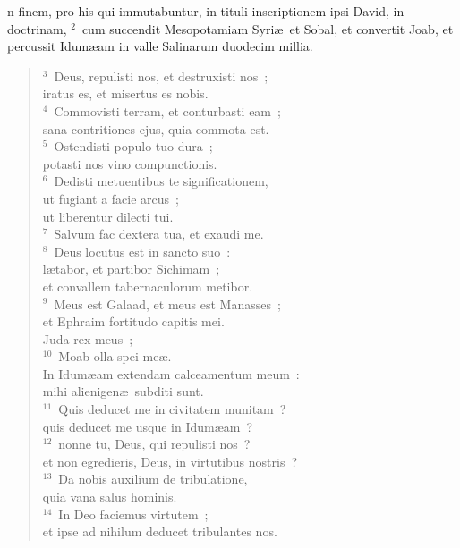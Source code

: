 \bchapter
{}n finem, pro his qui immutabuntur, in tituli inscriptionem ipsi David, in doctrinam,
${}^{2}$~cum succendit Mesopotamiam Syri\ae\ et Sobal, et convertit Joab, et percussit Idum\ae am in valle Salinarum duodecim millia.
\begin{flushleft}\begin{verse}${}^{3}$~Deus, repulisti nos, et destruxisti nos~;\\ iratus es, et misertus es nobis.\\
${}^{4}$~Commovisti terram, et conturbasti eam~;\\ sana contritiones ejus, quia commota est.\\
${}^{5}$~Ostendisti populo tuo dura~;\\ potasti nos vino compunctionis.\\
${}^{6}$~Dedisti metuentibus te significationem,\\ ut fugiant a facie arcus~;\\ ut liberentur dilecti tui.\\
${}^{7}$~Salvum fac dextera tua, et exaudi me.\\
${}^{8}$~Deus locutus est in sancto suo~:\\ l\ae tabor, et partibor Sichimam~;\\ et convallem tabernaculorum metibor.\\
${}^{9}$~Meus est Galaad, et meus est Manasses~;\\ et Ephraim fortitudo capitis mei.\\ Juda rex meus~;\\
${}^{10}$~Moab olla spei me\ae .\\ In Idum\ae am extendam calceamentum meum~:\\ mihi alienigen\ae\ subditi sunt.\\
${}^{11}$~Quis deducet me in civitatem munitam~?\\ quis deducet me usque in Idum\ae am~?\\
${}^{12}$~nonne tu, Deus, qui repulisti nos~?\\ et non egredieris, Deus, in virtutibus nostris~?\\
${}^{13}$~Da nobis auxilium de tribulatione,\\ quia vana salus hominis.\\
${}^{14}$~In Deo faciemus virtutem~;\\ et ipse ad nihilum deducet tribulantes nos.\end{verse}\end{flushleft}



